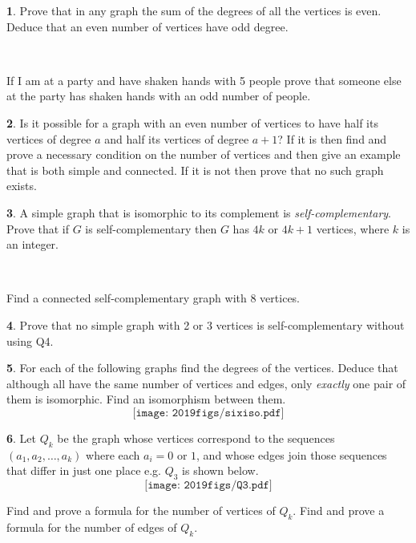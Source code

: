 \documentclass[12pt]{article}
\theoremstyle{definition}
\newtheorem{problem}{}
\begin{document}
\begin{problem}
Prove that in any graph the sum of the degrees of all the vertices is even. Deduce that an even number of vertices have odd degree.

\

If I am at a party and have shaken hands with 5 people prove that someone else at the party has shaken hands with an odd number of people.
\end{problem}

\begin{problem}
Is it possible for a graph with an even number of vertices to have half its vertices of degree $a$ and half its vertices of degree $a+1$? If it is then find and prove a necessary condition on the number of vertices and then give an example that is both simple and connected. If it is not then prove that no such graph exists.
\end{problem}

\begin{problem}
A simple graph that is isomorphic to its complement is \emph{self-complementary}. Prove that if $G$ is self-complementary then $G$ has $4k$ or $4k+1$ vertices, where $k$ is an integer. 

\


Find a connected self-complementary graph with 8 vertices.
\end{problem}



\begin{problem}
Prove that no simple graph with 2 or 3 vertices is self-complementary without using Q4.
\end{problem}



\begin{problem}
For each of the following graphs find the degrees of the vertices. Deduce that although all have the same number of vertices and edges, only \emph{exactly} one pair of them is isomorphic. Find an isomorphism between them.
$$\texttt{[image: 2019figs/sixiso.pdf]}$$
\end{problem}



\begin{problem}
Let $Q_k$ be the graph whose vertices correspond to the sequences $(a_1, a_2, \ldots , a_k)$ where each $a_i = 0$ or $1$, and whose edges join those sequences that differ in just one place e.g.  $Q_3$ is shown below.
$$\texttt{[image: 2019figs/Q3.pdf]}$$
\end{problem}

Find and prove a formula for the number of vertices of $Q_k$. Find and prove a formula for the number of edges of $Q_k$. 
\end{document}

